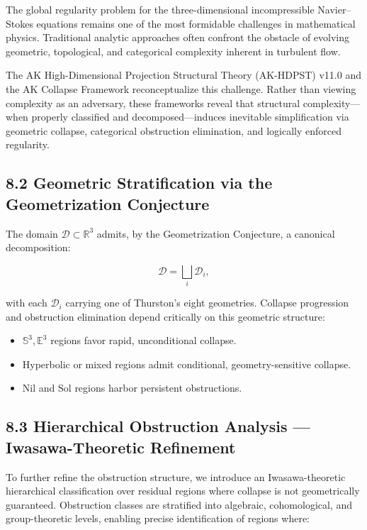 \documentclass[11pt]{article}
\begin{document}
The global regularity problem for the three-dimensional incompressible Navier--Stokes equations remains one of the most formidable challenges in mathematical physics. Traditional analytic approaches often confront the obstacle of evolving geometric, topological, and categorical complexity inherent in turbulent flow.

The AK High-Dimensional Projection Structural Theory (AK-HDPST) v11.0 and the AK Collapse Framework reconceptualize this challenge. Rather than viewing complexity as an adversary, these frameworks reveal that structural complexity---when properly classified and decomposed---induces inevitable simplification via geometric collapse, categorical obstruction elimination, and logically enforced regularity.

\subsection{8.2 Geometric Stratification via the Geometrization Conjecture}

The domain $\mathcal{D} \subset \mathbb{R}^3$ admits, by the Geometrization Conjecture, a canonical decomposition:

\[\mathcal{D} = \bigsqcup_i \mathcal{D}_i,\]

with each $\mathcal{D}_i$ carrying one of Thurston's eight geometries. Collapse progression and obstruction elimination depend critically on this geometric structure:

\begin{itemize}
    \item $\mathbb{S}^3, \mathbb{E}^3$ regions favor rapid, unconditional collapse.
    \item Hyperbolic or mixed regions admit conditional, geometry-sensitive collapse.
    \item $\mathrm{Nil}$ and $\mathrm{Sol}$ regions harbor persistent obstructions.
\end{itemize}

\subsection{8.3 Hierarchical Obstruction Analysis --- Iwasawa-Theoretic Refinement}

To further refine the obstruction structure, we introduce an Iwasawa-theoretic hierarchical classification over residual regions where collapse is not geometrically guaranteed. Obstruction classes are stratified into algebraic, cohomological, and group-theoretic levels, enabling precise identification of regions where:
\end{document}
